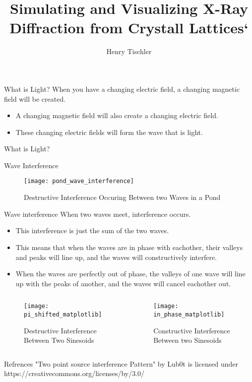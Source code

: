 \documentclass[aspectratio=169]{beamer}
\title {Simulating and Visualizing X-Ray Diffraction from Crystall Lattices`}
\author{Henry Tischler}
\institute[Institute of Computing in Research]
\begin{document}
	\titlepage


\begin {frame}{What is Light?}
	When you have a changing electric field, a changing magnetic field will be created.

	\begin{itemize}
	\item A changing magnetic field will also create a changing electric field.
	\item These changing electric fields will form the wave that is light.
	\end{itemize}		
\end{frame}

\begin {frame}{What is Light?}
\end{frame}


\begingroup
\begin{frame}{Wave Interference}
	\begin{figure}
		\texttt{[image: pond\_wave\_interference]}

	\caption {Destructive Interference Occuring Between two Waves in a Pond}
	\end{figure}

\end{frame}
\endgroup

\begin{frame}{Wave interference}
	When two waves meet, interference occurs.
	\begin{itemize}
	\item This interference is just the sum of the two waves.
	\item This means that when the waves are in phase with eachother, their valleys and peaks will line up, and the waves will constructively interfere.
	\item When the waves are perfectly out of phase, the valleys of one wave will line up with the peaks of another, and the waves will cancel eachother out.
	\end{itemize}
	

\begin{columns}[c]	

	\begin{column}{.5\textwidth}
		\begin{figure}
		\texttt{[image: pi\_shifted\_matplotlib]}
		\caption{Destructive Interference Between Two Sinesoids}
		\end{figure}
	\end{column}
	

	
	\begin{column}{.5\textwidth}
		\begin{figure}
			\texttt{[image: in\_phase\_matplotlib]}
			\caption{Constructive Interference Between two Sinesoids}
		\end{figure}
	\end{column}
\end{columns}

\end{frame}

\begin{frame}{Refrences}
	"Two point source interference Pattern" by Lub0t is licensed under https://creativecommons.org/licenses/by/3.0/
\end{frame}
\end{document}
